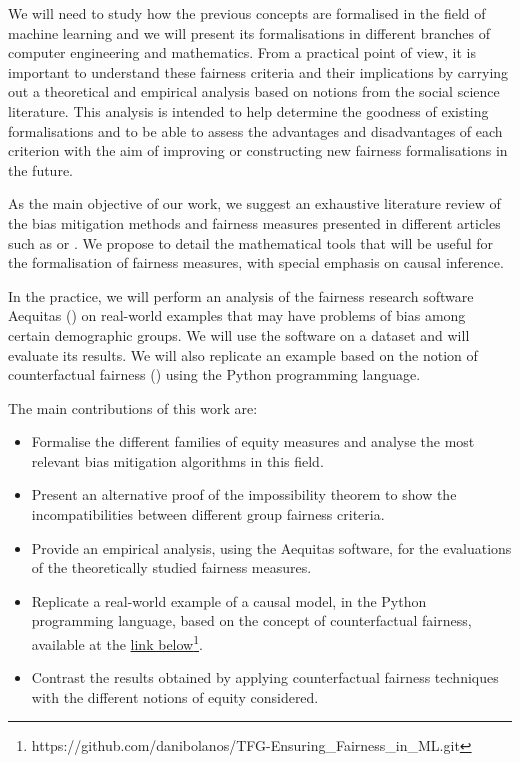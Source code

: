 We will need to study how the previous concepts are formalised in the field of machine learning and we will present its formalisations in different branches of computer engineering and mathematics. From a practical point of view, it is important to understand these fairness criteria and their implications by carrying out a theoretical and empirical analysis based on notions from the social science literature. This analysis is intended to help determine the goodness of existing formalisations and to be able to assess the advantages and disadvantages of each criterion with the aim of improving or constructing new fairness formalisations in the future. 

As the main objective of our work, we suggest an exhaustive literature review of the bias mitigation methods and fairness measures presented in different articles such as \cite{formalizing2018} or \cite{definitions2018}. We propose to detail the mathematical tools that will be useful for the formalisation of fairness measures, with special emphasis on causal inference.

In the practice, we will perform an analysis of the fairness research software Aequitas (\cite{aequitas2019}) on real-world examples that may have problems of bias among certain demographic groups. We will use the software on a dataset and will evaluate its results. We will also replicate an example based on the notion of counterfactual fairness (\cite{counterfactual2018}) using the Python programming language.

The main contributions of this work are:

\begin{itemize}
    \item Formalise the different families of equity measures and analyse the most relevant bias mitigation algorithms in this field.
    \item Present an alternative proof of the impossibility theorem to show the incompatibilities between different group fairness criteria.
    \item Provide an empirical analysis, using the Aequitas software, for the evaluations of the theoretically studied fairness measures.
    \item Replicate a real-world example of a causal model, in the Python programming language, based on the concept of counterfactual fairness, available at the \href{https://github.com/danibolanos/TFG-Ensuring_Fairness_in_ML.git}{link below}\footnote{https://github.com/danibolanos/TFG-Ensuring\_Fairness\_in\_ML.git}.
    \item Contrast the results obtained by applying counterfactual fairness techniques with the different notions of equity considered.
\end{itemize}

